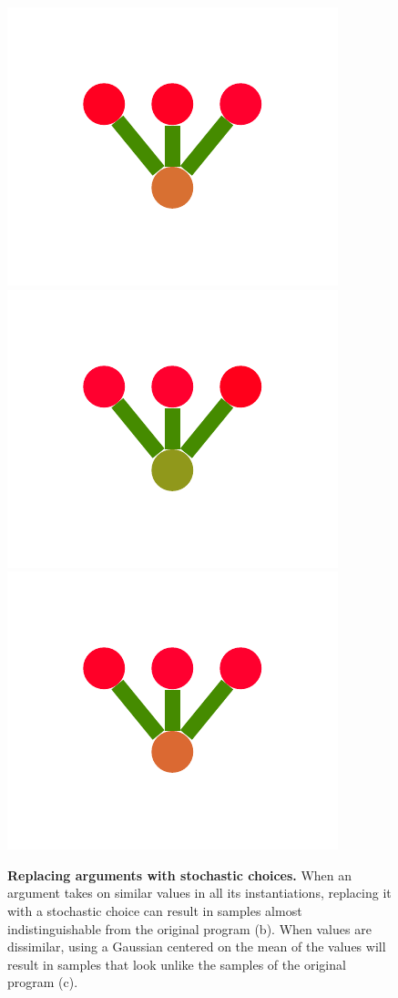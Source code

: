 \documentclass[a4paper,10pt]{article}
\begin{document}
\begin{figure}
{    \includegraphics[scale=.26]{../figures/vector/4-2-1-noisyprog-postB-6.pdf}
    \includegraphics[scale=.26]{../figures/vector/4-2-1-noisyprog-postB-7.pdf}
    \includegraphics[scale=.26]{../figures/vector/4-2-1-noisyprog-postB-8.pdf}
    \label{fig:noisy-bad}        
    }
  \caption{{\bf Replacing arguments with stochastic choices.} When an argument takes on similar values in all its instantiations, replacing it with a stochastic choice can result in samples almost indistinguishable from the original program (b). When values are dissimilar, using a Gaussian centered on the mean of the values will result in samples that look unlike the samples of the original program (c).}
\end{figure}
\end{document}
